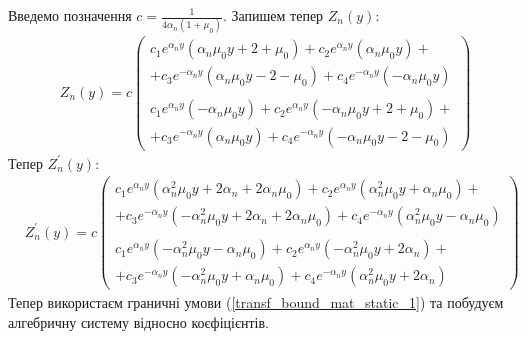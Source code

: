 Введемо позначення $c = \frac{1}{4\alpha_n (1 + \mu_0)}$. \newline
Запишем тепер $Z_n(y)$:
\begin{align*}
    &Z_n(y) = c
    \begin{pmatrix}
        c_1 e^{\alpha_n y} (\alpha_n \mu_0 y + 2 + \mu_0) + c_2 e^{\alpha_n y} (\alpha_n \mu_0 y) + 
        \\ + c_3 e^{-\alpha_n y} (\alpha_n \mu_0 y - 2 - \mu_0) + c_4 e^{-\alpha_n y} (-\alpha_n \mu_0 y) \\
        \\
        c_1 e^{\alpha_n y} (-\alpha_n \mu_0 y) + c_2 e^{\alpha_n y} (-\alpha_n \mu_0 y + 2 + \mu_0) + 
        \\ + c_3 e^{-\alpha_n y} (\alpha_n \mu_0 y) + c_4 e^{-\alpha_n y} (-\alpha_n \mu_0 y - 2 - \mu_0)
    \end{pmatrix}
\end{align*}
Тепер $Z_n^{'}(y)$:
\begin{align*}
    &Z_n^{'}(y) = c
    \begin{pmatrix}
        c_1 e^{\alpha_n y} (\alpha_n^2 \mu_0 y + 2 \alpha_n + 2 \alpha_n \mu_0) + c_2 e^{\alpha_n y} (\alpha_n^2 \mu_0 y + \alpha_n \mu_0) + 
        \\ + c_3 e^{-\alpha_n y} (-\alpha_n^2 \mu_0 y + 2 \alpha_n + 2 \alpha_n \mu_0) + c_4 e^{-\alpha_n y} (\alpha_n^2 \mu_0 y - \alpha_n \mu_0) \\
        \\
        c_1 e^{\alpha_n y} (-\alpha_n^2 \mu_0 y - \alpha_n \mu_0) + c_2 e^{\alpha_n y} (-\alpha_n^2 \mu_0 y + 2 \alpha_n) + 
        \\ + c_3 e^{-\alpha_n y} (-\alpha_n^2 \mu_0 y + \alpha_n \mu_0) + c_4 e^{-\alpha_n y} (\alpha_n^2 \mu_0 y + 2 \alpha_n)
    \end{pmatrix}
\end{align*}
Тепер використаєм граничні умови (\ref{transf_bound_mat_static_1}) та побудуєм алгебричну систему відносно коєфіцієнтів.

